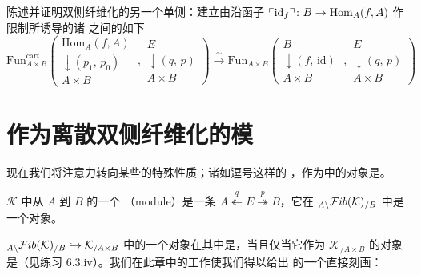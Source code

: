 \begin{exercise}\label{ex:other-one-sided-yoneda}
陈述并证明双侧纤维化的另一个单侧\trYonedaLemma{}：建立由沿函子
$\ulcorner\mathrm{id}_{f}\urcorner\colon B\to\mathrm{Hom}_{A}(f,A)$ 作限制所诱导的诸%
\trFunctorSpace{}之间的如下\trEquivalence
{\small\[
\mathrm{Fun}_{A\times B}^{\mathrm{cart}}\!\left(
\begin{gathered}
\mathrm{Hom}_{A}(f,A)\\[-2pt]
\downarrow\scriptstyle (p_{1},\,p_{0})\\[-2pt]
A\times B
\end{gathered}
\;\right.,
\left.
\begin{gathered}
E\\[-2pt]
\downarrow\scriptstyle (q,\,p)\\[-2pt]
A\times B
\end{gathered}
\right)
\xrightarrow{\ \sim\ }
\mathrm{Fun}_{A\times B}\!\left(
\begin{gathered}
B\\[-2pt]
\downarrow\scriptstyle (f,\,\mathrm{id})\\[-2pt]
A\times B
\end{gathered}
\;\right.,
\left.
\begin{gathered}
E\\[-2pt]
\downarrow\scriptstyle (q,\,p)\\[-2pt]
A\times B
\end{gathered}
\right)
\]}
\end{exercise}

\section{作为离散双侧纤维化的模}\label{sec:modules-as-discrete-two-sided-fibrations}

现在我们将注意力转向某些\trTwoSidedFibration{}的特殊性质；诸如逗号\trSpan{}这样的%
\trTwoSidedFibration{}，作为\trSliceInfinityCosmos{}中的对象是\trDiscrete{}。

\begin{definition}\label{def:modules}
\trInfinityCosmos{} $\mathcal{K}$ 中从 $A$ 到 $B$ 的一个\textbf{\trModule}%
（module）是一条\trTwoSidedFibration{}
$A\overset{q}{\twoheadleftarrow}E\overset{p}{\twoheadrightarrow}B$，它在
${}_{A\backslash}\mathcal{F}ib(\mathcal{K})_{/B}$ 中是一个\trDiscrete{}对象。
\end{definition}

\trCosmologicallyEmbedded{}\trInfinityCosmos{}
${}_{A\backslash}\mathcal{F}ib(\mathcal{K})_{/B}\hookrightarrow\mathcal{K}_{/A\times B}$
中的一个对象在其中是\trDiscrete{}，当且仅当它作为 $\mathcal{K}_{/A\times B}$
的对象是\trDiscrete{}（见练习 6.3.iv）。我们在此章中的工作使我们得以给出%
\trModule{}的一个直接刻画：

